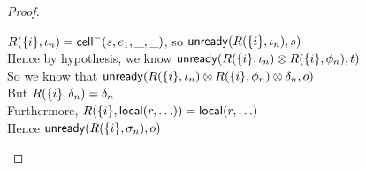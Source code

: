 \begin{proof}
\begin{itemize}
    \begin{tabbedproof}
      \oo $R(\{{i}\}, \iota_n) = \mathsf{cell}^{-}({s}, {e_1}, {\_}, {\_})$, so $\mathsf{unready}({R(\{{i}\}, \iota_n)}, {s})$ \\
      \oo Hence by hypothesis, we know $\mathsf{unready}({R(\{{i}\}, \iota_n) \otimes R(\{{i}\}, \phi_n)}, {t})$ \\
      \oo So we know that $\mathsf{unready}({R(\{{i}\}, \iota_n) \otimes R(\{{i}\}, \phi_n) \otimes \delta_n}, {o})$ \\
      \oo But $R(\{{i}\}, \delta_n) = \delta_n$ \\
      \oo Furthermore, $R(\{{i}\}, \mathsf{local}({r}, {\ldots})) = \mathsf{local}({r}, {\ldots})$ \\
      \oo Hence $\mathsf{unready}({R(\{{i}\}, \sigma_n)}, {o})$ 
    \end{tabbedproof}

  \end{itemize}


\end{proof}
